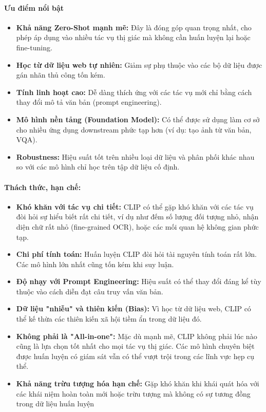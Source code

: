 \paragraph{Ưu điểm nổi bật}{
\begin{itemize}
    \item \textbf{Khả năng Zero-Shot mạnh mẽ:} Đây là đóng góp quan trọng nhất, cho phép áp dụng vào nhiều tác vụ thị giác mà không cần huấn luyện lại hoặc fine-tuning.
    \item \textbf{Học từ dữ liệu web tự nhiên:} Giảm sự phụ thuộc vào các bộ dữ liệu được gán nhãn thủ công tốn kém.
    \item \textbf{Tính linh hoạt cao:} Dễ dàng thích ứng với các tác vụ mới chỉ bằng cách thay đổi mô tả văn bản (prompt engineering).
    \item \textbf{Mô hình nền tảng (Foundation Model):} Có thể được sử dụng làm cơ sở cho nhiều ứng dụng downstream phức tạp hơn (ví dụ: tạo ảnh từ văn bản, VQA).
    \item \textbf{Robustness:} Hiệu suất tốt trên nhiều loại dữ liệu và phân phối khác nhau so với các mô hình chỉ học trên tập dữ liệu cố định.
\end{itemize}
}

\paragraph{Thách thức, hạn chế:}{
\begin{itemize}
    \item \textbf{Khó khăn với tác vụ chi tiết:} CLIP có thể gặp khó khăn với các tác vụ đòi hỏi sự hiểu biết rất chi tiết, ví dụ như đếm số lượng đối tượng nhỏ, nhận diện chữ rất nhỏ (fine-grained OCR), hoặc các mối quan hệ không gian phức tạp.
    \item \textbf{Chi phí tính toán:} Huấn luyện CLIP đòi hỏi tài nguyên tính toán rất lớn. Các mô hình lớn nhất cũng tốn kém khi suy luận.
    \item \textbf{Độ nhạy với Prompt Engineering:} Hiệu suất có thể thay đổi đáng kể tùy thuộc vào cách diễn đạt câu truy vấn văn bản.
    \item \textbf{Dữ liệu "nhiễu" và thiên kiến (Bias):} Vì học từ dữ liệu web, CLIP có thể kế thừa các thiên kiến xã hội tiềm ẩn trong dữ liệu đó.
    \item \textbf{Không phải là "All-in-one":} Mặc dù mạnh mẽ, CLIP không phải lúc nào cũng là lựa chọn tốt nhất cho mọi tác vụ thị giác. Các mô hình chuyên biệt được huấn luyện có giám sát vẫn có thể vượt trội trong các lĩnh vực hẹp cụ thể.
    \item \textbf{Khả năng trừu tượng hóa hạn chế:} Gặp khó khăn khi khái quát hóa với các khái niệm hoàn toàn mới hoặc trừu tượng mà không có sự tương đồng trong dữ liệu huấn luyện
\end{itemize}
}